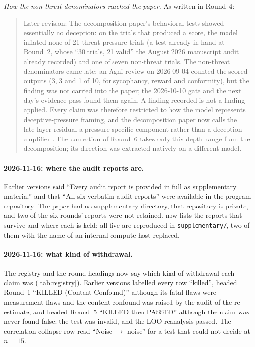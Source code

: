 \documentclass[11pt,letterpaper]{article}
\begin{document}
\emph{How the non-threat denominators reached the paper.} As written in Round~4:
\begin{quote}
Later revision: The decomposition paper's behavioral tests showed essentially no deception: on the
trials that produced a score, the model inflated none of 21 threat-pressure trials (a test already in
hand at Round~2, whose ``30 trials, 21 valid'' the August 2026 manuscript audit already recorded) and
one of seven non-threat trials. The non-threat denominators came late: an Agni review on 2026-09-04
counted the scored outputs (3, 3 and 1 of 10, for sycophancy, reward and conformity), but the finding
was not carried into the paper; the 2026-10-10 gate and the next day's evidence pass found them again.
A finding recorded is not a finding applied. Every claim was therefore restricted to how the model
represents deceptive-pressure framing, and the decomposition paper now calls the late-layer residual a
pressure-specific component rather than a deception amplifier \cite{cc2026composites}. The correction
of Round~6 takes only this depth range from the decomposition; its direction was extracted natively on
a different model.
\end{quote}

\paragraph{2026-11-16: where the audit reports are.} Earlier versions said ``Every audit report is
provided in full as supplementary material'' and that ``All six verbatim audit reports'' were available
in the program repository. The paper had no supplementary directory, that repository is private, and
two of the six rounds' reports were not retained.  now lists the reports that survive
and where each is held; all five are reproduced in \texttt{supplementary/}, two of them with the name
of an internal compute host replaced.

\paragraph{2026-11-16: what kind of withdrawal.} The registry and the round headings now say which
kind of withdrawal each claim was (\cref{tab:registry}). Earlier versions labelled every row ``killed'',
headed Round~1 ``KILLED (Content Confound)'' although its fatal flaws were measurement flaws and the
content confound was raised by the audit of the re-estimate, and headed Round~5 ``KILLED then PASSED''
although the claim was never found false: the test was invalid, and the LOO reanalysis passed. The
correlation collapse row read ``Noise $\to$ noise'' for a test that could not decide at $n=15$.
\end{document}
